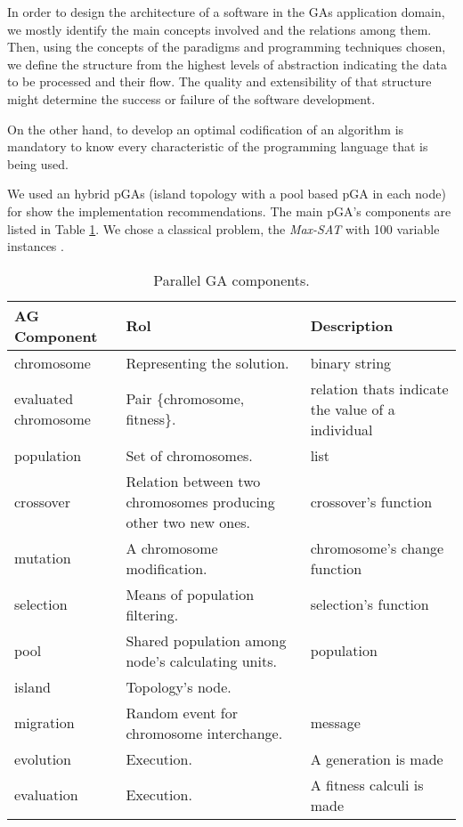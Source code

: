 
In order to design the architecture of a software in the GAs application domain, we mostly identify the main concepts involved and the relations among them. Then, using the concepts of the paradigms and programming techniques chosen, we define the structure from the highest levels of abstraction indicating the data to be processed and their flow. The quality and extensibility of that structure might determine the success or failure of the software development.

On the other hand, to develop an optimal codification of an algorithm is mandatory to know every characteristic of the programming language that is being used.

We used an hybrid pGAs (island topology with a pool based pGA in each node) for show the implementation recommendations. The main pGA’s components are listed in Table \ref{agpComp}. We chose a classical problem, the {\em Max-SAT} with 100 variable instances \cite{Hoos2000}.


\begin{table}
  \centering
  \caption{Parallel GA components.}\label{agpComp}
   \begin{tabular}{|>{\centering}p{2.4cm}|p{2.8cm}|p{2.4cm}|}
   \hline
   \textbf{AG Component} & \textbf{Rol} & \textbf{Description} \\
     \hline
      chromosome & Representing the solution. & binary string \\
     \hline
      evaluated chromosome & Pair \{chromosome, fitness\}. & relation thats indicate the value of a individual\\
     \hline
      population & Set of chromosomes. & list \\
     \hline
     crossover & Relation between two chromosomes producing other two new ones. & crossover's function \\
     \hline
      mutation & A chromosome modification. & chromosome's change function \\
     \hline
     selection & Means of population filtering. & selection's function \\
     \hline
      pool & Shared population among node's calculating units. & population \\
     \hline
      island & Topology's node. &  \\
     \hline
      migration & Random event for chromosome interchange. & message \\
     \hline
      evolution & Execution. & A generation is made \\
     \hline
      evaluation & Execution. & A fitness calculi is made \\
     \hline
   \end{tabular}

\end{table}
